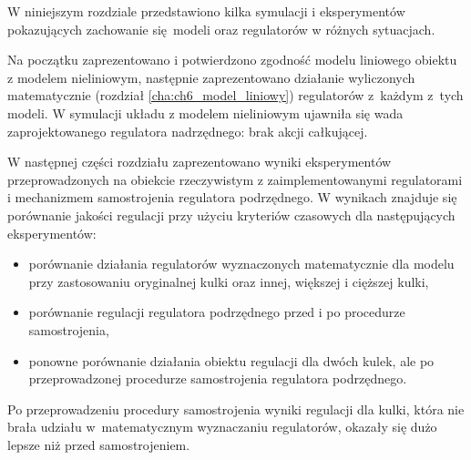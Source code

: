 W niniejszym rozdziale przedstawiono kilka symulacji i eksperymentów pokazujących zachowanie się modeli oraz regulatorów w różnych sytuacjach.

Na początku zaprezentowano i potwierdzono zgodność modelu liniowego obiektu z modelem nieliniowym, następnie zaprezentowano działanie wyliczonych matematycznie (rozdział \ref{cha:ch6_model_liniowy}) regulatorów z~każdym z~tych modeli. W symulacji układu z modelem nieliniowym ujawniła się wada zaprojektowanego regulatora nadrzędnego: brak akcji całkującej.

W następnej części rozdziału zaprezentowano wyniki eksperymentów przeprowadzonych na obiekcie rzeczywistym z zaimplementowanymi regulatorami i mechanizmem samostrojenia regulatora podrzędnego. W wynikach znajduje się porównanie jakości regulacji przy użyciu kryteriów czasowych dla następujących eksperymentów:
\begin{itemize}
    \item porównanie działania regulatorów wyznaczonych matematycznie dla modelu przy zastosowaniu oryginalnej kulki oraz innej, większej i cięższej kulki,
    \item porównanie regulacji regulatora podrzędnego przed i po procedurze samostrojenia,
    \item ponowne porównanie działania obiektu regulacji dla dwóch kulek, ale po przeprowadzonej procedurze samostrojenia regulatora podrzędnego.
\end{itemize}

Po przeprowadzeniu procedury samostrojenia wyniki regulacji dla kulki, która nie brała udziału w~matematycznym wyznaczaniu regulatorów, okazały się dużo lepsze niż przed samostrojeniem.



